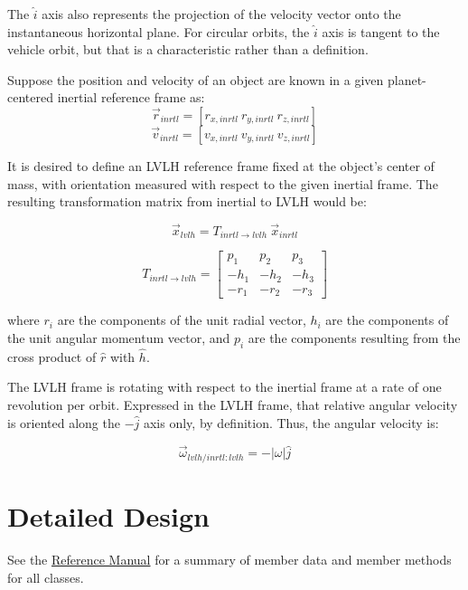 The $\hat i$ axis also represents the projection of the velocity vector onto
the instantaneous horizontal plane. For circular orbits, the $\hat i$ axis is
tangent to the vehicle orbit, but that is a characteristic rather than a definition.

Suppose the position and velocity of an object are known in a given planet-
centered inertial reference frame as:
\begin{equation*}
 \vec r_{inrtl} = [r_{x,inrtl} ~ r_{y,inrtl} ~ r_{z,inrtl}]
\end{equation*}
\begin{equation*}
 \vec v_{inrtl} = [v_{x,inrtl} ~ v_{y,inrtl} ~ v_{z,inrtl}]
\end{equation*}

It is desired to define an LVLH reference frame fixed at the object's center
of mass, with orientation measured with respect to the given inertial frame. The
resulting transformation matrix from inertial to LVLH would be:

\begin{equation*}
 \vec x_{lvlh} = T_{inrtl \rightarrow lvlh} ~ \vec x_{inrtl}
\end{equation*}

\begin{equation*}
 T_{inrtl \rightarrow lvlh} = \begin{bmatrix} p_1 & p_2 & p_3 \\
                                             -h_1 & -h_2 & -h_3 \\
                                             -r_1 & -r_2 & -r_3 \end{bmatrix}
\end{equation*}

where $r_i$ are the components of the unit radial vector,
$h_i$ are the components of the unit angular momentum vector,
and $p_i$ are the components resulting from the cross product of
$\hat r$ with $\hat h$.

The LVLH frame is rotating with respect to the inertial frame at a rate of one
revolution per orbit. Expressed in the LVLH frame, that relative angular velocity
is oriented along the $-\hat j$ axis only, by definition. Thus, the angular
velocity is:

\begin{equation*}
 \vec \omega_{lvlh/inrtl:lvlh}  = - \lvert \omega \rvert \hat j
\end{equation*}


\section{Detailed Design}
See the \href{file:refman.pdf}{Reference Manual}\cite{api:lvlh_frame}
for a summary of member data and member methods for all classes.

